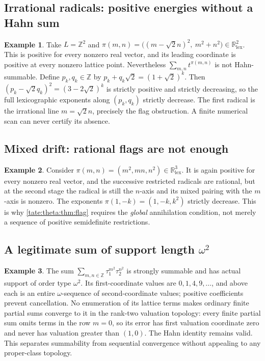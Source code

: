 \documentclass[11pt,letterpaper]{article}
\theoremstyle{definition}
\newtheorem{example}[example]{Example}
\newcommand{\R}{\mathbb R}
\newcommand{\Z}{\mathbb Z}
\newcommand{\lex}{\mathrm{lex}}
\begin{document}
\subsection{Irrational radicals: positive energies without a Hahn sum}

\begin{example}\label{tate:theta:ex:irrational}
Take $L=\Z^2$ and $\pi(m,n)=\bigl((m-\sqrt2n)^2,\ m^2+n^2\bigr)\in\R^2_{\lex}$.
This is positive for every nonzero real vector, and its leading coordinate
is positive at every nonzero lattice point. Nevertheless
$\sum_{m,n}t^{\pi(m,n)}$ is not Hahn-summable. Define $p_k,q_k\in\Z$ by
$p_k+q_k\sqrt2=(1+\sqrt2)^k$. Then $(p_k-\sqrt2q_k)^2=(3-2\sqrt2)^k$ is
strictly positive and strictly decreasing, so the full lexicographic
exponents along $(p_k,q_k)$ strictly decrease. The first radical is the
irrational line $m=\sqrt2n$, precisely the flag obstruction. A finite
numerical scan can never certify its absence.
\end{example}

\subsection{Mixed drift: rational flags are not enough}

\begin{example}\label{tate:theta:ex:cross}
Consider $\pi(m,n)=(m^2,mn,n^2)\in\R^3_{\lex}$. It is again positive for
every nonzero real vector, and the successive restricted radicals are
rational, but at the second stage the radical is still the $n$-axis and its
mixed pairing with the $m$-axis is nonzero. The exponents
$\pi(1,-k)=(1,-k,k^2)$ strictly decrease. This is why
\cref{tate:theta:thm:flag} requires the \emph{global} annihilation
condition, not merely a sequence of positive semidefinite restrictions.
\end{example}

\subsection{A legitimate sum of support length \texorpdfstring{$\omega^2$}{omega squared}}

\begin{example}\label{tate:theta:ex:omega2}
The sum $\sum_{m,n\in\Z}\tau_1^{m^2}\tau_2^{n^2}$ is strongly summable and
has actual support of order type $\omega^2$. Its first-coordinate values are
$0,1,4,9,\ldots$, and above each is an entire $\omega$-sequence of
second-coordinate values; positive coefficients prevent cancellation. No
enumeration of its lattice terms makes ordinary finite partial sums
converge to it in the rank-two valuation topology: every finite partial sum
omits terms in the row $m=0$, so its error has first valuation coordinate
zero and never has valuation greater than $(1,0)$. The Hahn identity
remains valid. This separates summability from sequential convergence
without appealing to any proper-class topology.
\end{example}
\end{document}
